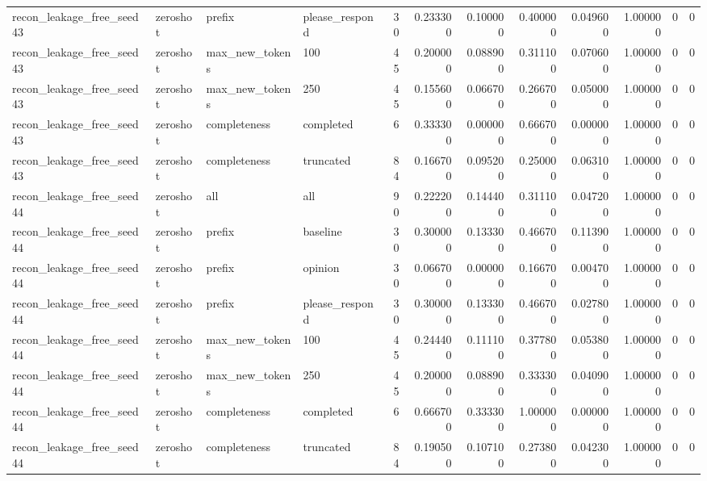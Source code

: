 \begin{tabular}{llllrrrrrrrr}
recon_leakage_free_seed43 & zeroshot & prefix & please_respond & 30 & 0.233300 & 0.100000 & 0.400000 & 0.049600 & 1.000000 & 0 & 0 \\
recon_leakage_free_seed43 & zeroshot & max_new_tokens & 100 & 45 & 0.200000 & 0.088900 & 0.311100 & 0.070600 & 1.000000 & 0 & 0 \\
recon_leakage_free_seed43 & zeroshot & max_new_tokens & 250 & 45 & 0.155600 & 0.066700 & 0.266700 & 0.050000 & 1.000000 & 0 & 0 \\
recon_leakage_free_seed43 & zeroshot & completeness & completed & 6 & 0.333300 & 0.000000 & 0.666700 & 0.000000 & 1.000000 & 0 & 0 \\
recon_leakage_free_seed43 & zeroshot & completeness & truncated & 84 & 0.166700 & 0.095200 & 0.250000 & 0.063100 & 1.000000 & 0 & 0 \\
recon_leakage_free_seed44 & zeroshot & all & all & 90 & 0.222200 & 0.144400 & 0.311100 & 0.047200 & 1.000000 & 0 & 0 \\
recon_leakage_free_seed44 & zeroshot & prefix & baseline & 30 & 0.300000 & 0.133300 & 0.466700 & 0.113900 & 1.000000 & 0 & 0 \\
recon_leakage_free_seed44 & zeroshot & prefix & opinion & 30 & 0.066700 & 0.000000 & 0.166700 & 0.004700 & 1.000000 & 0 & 0 \\
recon_leakage_free_seed44 & zeroshot & prefix & please_respond & 30 & 0.300000 & 0.133300 & 0.466700 & 0.027800 & 1.000000 & 0 & 0 \\
recon_leakage_free_seed44 & zeroshot & max_new_tokens & 100 & 45 & 0.244400 & 0.111100 & 0.377800 & 0.053800 & 1.000000 & 0 & 0 \\
recon_leakage_free_seed44 & zeroshot & max_new_tokens & 250 & 45 & 0.200000 & 0.088900 & 0.333300 & 0.040900 & 1.000000 & 0 & 0 \\
recon_leakage_free_seed44 & zeroshot & completeness & completed & 6 & 0.666700 & 0.333300 & 1.000000 & 0.000000 & 1.000000 & 0 & 0 \\
recon_leakage_free_seed44 & zeroshot & completeness & truncated & 84 & 0.190500 & 0.107100 & 0.273800 & 0.042300 & 1.000000 & 0 & 0 \\
\bottomrule
\end{tabular}
